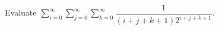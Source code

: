 Evaluate $\displaystyle\sum_{i=0}^{\infty}\sum_{j=0}^{\infty}\sum_{k=0}^{\infty}\dfrac{1}{(i+j+k+1)2^{i+j+k+1}}$.
